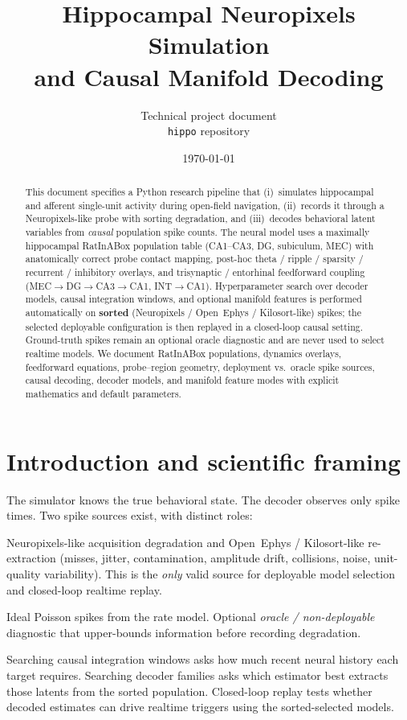 \documentclass[11pt,a4paper]{article}
\title{%
  Hippocampal Neuropixels Simulation\\
  and Causal Manifold Decoding%
}
\author{Technical project document\\[0.5em]
\large\texttt{hippo} repository}
\date{\today}
\begin{document}
\maketitle

\begin{abstract}
This document specifies a Python research pipeline that (i)~simulates hippocampal and afferent single-unit activity during open-field navigation, (ii)~records it through a Neuropixels-like probe with sorting degradation, and (iii)~decodes behavioral latent variables from \emph{causal} population spike counts.
The neural model uses a maximally hippocampal RatInABox population table (CA1--CA3, DG, subiculum, MEC) with anatomically correct probe contact mapping, post-hoc theta / ripple / sparsity / recurrent / inhibitory overlays, and trisynaptic / entorhinal feedforward coupling (MEC$\to$DG$\to$CA3$\to$CA1, INT$\to$CA1).
Hyperparameter search over decoder models, causal integration windows, and optional manifold features is performed automatically on \textbf{sorted} (Neuropixels / Open~Ephys / Kilosort-like) spikes; the selected deployable configuration is then replayed in a closed-loop causal setting.
Ground-truth spikes remain an optional oracle diagnostic and are never used to select realtime models.
We document RatInABox populations, dynamics overlays, feedforward equations, probe--region geometry, deployment vs.\ oracle spike sources, causal decoding, decoder models, and manifold feature modes with explicit mathematics and default parameters.
\end{abstract}

\tableofcontents
\newpage

\section{Introduction and scientific framing}

The simulator knows the true behavioral state.
The decoder observes only spike times.
Two spike sources exist, with distinct roles:
\begin{description}[leftmargin=*]
  \item[\textbf{Sorted spikes}] Neuropixels-like acquisition degradation and Open~Ephys / Kilosort-like re-extraction (misses, jitter, contamination, amplitude drift, collisions, noise, unit-quality variability).
  This is the \emph{only} valid source for deployable model selection and closed-loop realtime replay.
  \item[\textbf{Ground-truth spikes}] Ideal Poisson spikes from the rate model.
  Optional \emph{oracle / non-deployable} diagnostic that upper-bounds information before recording degradation.
\end{description}
Searching causal integration windows asks how much recent neural history each target requires.
Searching decoder families asks which estimator best extracts those latents from the sorted population.
Closed-loop replay tests whether decoded estimates can drive realtime triggers using the sorted-selected models.
\end{document}
